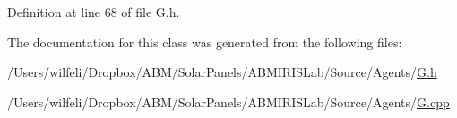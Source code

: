 Definition at line 68 of file G.\+h.



The documentation for this class was generated from the following files\+:\begin{DoxyCompactItemize}
\item 
/\+Users/wilfeli/\+Dropbox/\+A\+B\+M/\+Solar\+Panels/\+A\+B\+M\+I\+R\+I\+S\+Lab/\+Source/\+Agents/\hyperlink{_g_8h}{G.\+h}\item 
/\+Users/wilfeli/\+Dropbox/\+A\+B\+M/\+Solar\+Panels/\+A\+B\+M\+I\+R\+I\+S\+Lab/\+Source/\+Agents/\hyperlink{_g_8cpp}{G.\+cpp}\end{DoxyCompactItemize}
